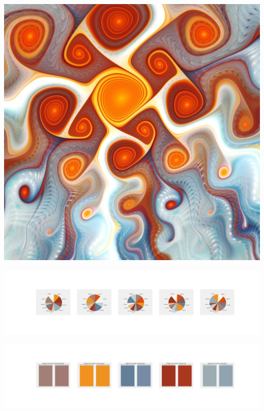 \documentclass[11pt]{article}
\begin{document}
\begin{landscape}
    \begin{center}
    \includegraphics[width=\textwidth]{./nbimg/file (301).jpg}
    \end{center}

    \begin{center}
    \includegraphics[width=250mm]{./nbimg/pie-225.jpg}
    \end{center}

    \begin{center}
    \includegraphics[width=250mm]{./nbimg/peak-225.jpg}
    \end{center}
    


\end{landscape}
\end{document}
